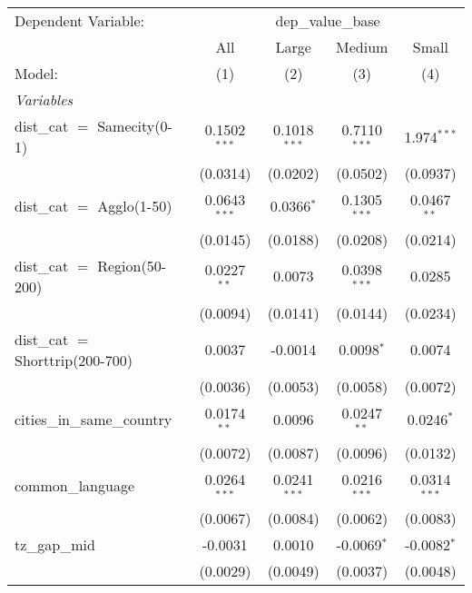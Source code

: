 \begingroup
\centering
\begin{tabular}{lcccc}
   \tabularnewline \midrule \midrule
   Dependent Variable: & \multicolumn{4}{c}{dep\_value\_base}\\
                                     & All             & Large          & Medium          & Small \\   
   Model:                            & (1)             & (2)            & (3)             & (4)\\  
   \midrule
   \emph{Variables}\\
   dist\_cat $=$ Samecity(0-1)       & 0.1502$^{***}$  & 0.1018$^{***}$ & 0.7110$^{***}$  & 1.974$^{***}$\\   
                                     & (0.0314)        & (0.0202)       & (0.0502)        & (0.0937)\\   
   dist\_cat $=$ Agglo(1-50)         & 0.0643$^{***}$  & 0.0366$^{*}$   & 0.1305$^{***}$  & 0.0467$^{**}$\\   
                                     & (0.0145)        & (0.0188)       & (0.0208)        & (0.0214)\\   
   dist\_cat $=$ Region(50-200)      & 0.0227$^{**}$   & 0.0073         & 0.0398$^{***}$  & 0.0285\\   
                                     & (0.0094)        & (0.0141)       & (0.0144)        & (0.0234)\\   
   dist\_cat $=$ Shorttrip(200-700)  & 0.0037          & -0.0014        & 0.0098$^{*}$    & 0.0074\\   
                                     & (0.0036)        & (0.0053)       & (0.0058)        & (0.0072)\\   
   cities\_in\_same\_country         & 0.0174$^{**}$   & 0.0096         & 0.0247$^{**}$   & 0.0246$^{*}$\\   
                                     & (0.0072)        & (0.0087)       & (0.0096)        & (0.0132)\\   
   common\_language                  & 0.0264$^{***}$  & 0.0241$^{***}$ & 0.0216$^{***}$  & 0.0314$^{***}$\\   
                                     & (0.0067)        & (0.0084)       & (0.0062)        & (0.0083)\\   
   tz\_gap\_mid                      & -0.0031         & 0.0010         & -0.0069$^{*}$   & -0.0082$^{*}$\\   
                                     & (0.0029)        & (0.0049)       & (0.0037)        & (0.0048)\\   

\end{tabular}
